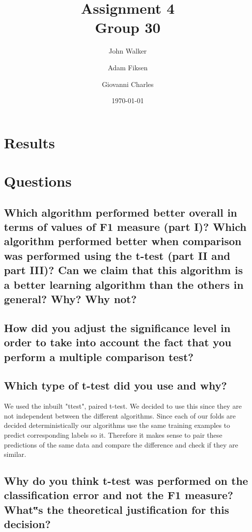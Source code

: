 \documentclass[11pt]{article}
\begin{document}
\title{Assignment 4 \\ Group 30  }

\author{John Walker \and Adam Fiksen \and Giovanni Charles }

\date{\today}         %

\maketitle           %



\section{Results}

\section{Questions}
\subsection{Which algorithm performed better overall in terms of values of F1 measure (part I)? Which algorithm performed better when comparison was performed using the t-test (part II and part III)? Can we claim that this algorithm is a better learning algorithm than the others in general? Why? Why not?}

\subsection{How did you adjust the significance level in order to take into account the fact that you perform a multiple comparison test?}

\subsection{Which type of t-test did you use and why?}

We used the inbuilt "ttest", paired t-test. We decided to use this since they are not independent between the different algorithms. Since each of our folds are decided deterministically our algorithms use the same training examples to predict corresponding labels so it. Therefore it makes sense to pair these predictions of the same data and compare the difference and check if they are similar.  

\subsection{Why do you think t-test was performed on the classification error and not the F1 measure? What‟s the theoretical justification for this decision?}
\end{document}
